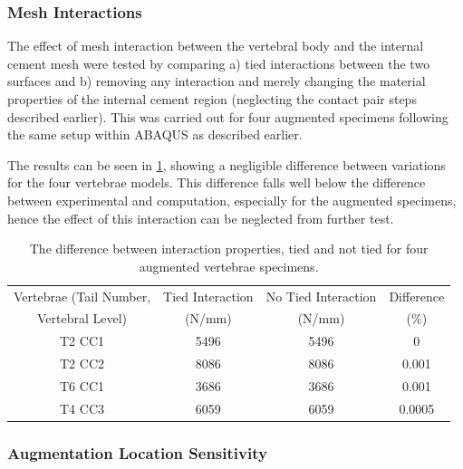 \subsubsection{Mesh Interactions}\label{mesh-interactions}

The effect of mesh interaction between the vertebral body and the internal
cement mesh were tested by comparing a) tied interactions between the two
surfaces and b) removing any interaction and merely changing the material
properties of the internal cement region (neglecting the contact pair steps
described earlier). This was carried out for four augmented specimens following
the same setup within ABAQUS as described earlier.

The results can be seen in \cref{tab:meshint}, showing a negligible difference
between variations for the four vertebrae models. This difference falls well
below the difference between experimental and computation, especially for the
augmented specimens, hence the effect of this interaction can be neglected from
further test.

\begin{table}[ht!]

\caption{The difference between interaction properties, tied and not tied for
four augmented vertebrae specimens.}
\label{tab:meshint}
\centering
  \begin{tabular}{c|c|c|c}
Vertebrae (Tail Number,  & Tied Interaction  & No Tied Interaction  &
Difference \\
Vertebral Level) & (N/mm) & (N/mm) & (\%) \\
\hline
\hline

T2 CC1 &	 5496 &	 5496 &	 0\\
T2 CC2 &	 8086 &	 8086 &	 0.001\\
T6 CC1 &	 3686 &	 3686 &	 0.001\\
T4 CC3 &	 6059 &	 6059 &	 0.0005\\ \hline

\end{tabular}
\end{table}



\subsubsection{Augmentation Location Sensitivity}

